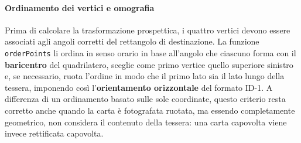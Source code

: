 \paragraph{Ordinamento dei vertici e omografia}
Prima di calcolare la trasformazione prospettica, i quattro vertici devono essere associati agli angoli corretti del rettangolo di destinazione.
La funzione \texttt{orderPoints} li ordina in senso orario in base all'angolo che ciascuno forma con il \textbf{baricentro} del quadrilatero, sceglie come primo vertice quello superiore sinistro e, se necessario, ruota l'ordine in modo che il primo lato sia il lato lungo della tessera, imponendo così l'\textbf{orientamento orizzontale} del formato ID-1.
A differenza di un ordinamento basato sulle sole coordinate, questo criterio resta corretto anche quando la carta è fotografata ruotata, ma essendo completamente geometrico, non considera il contenuto della tessera: una carta capovolta viene invece rettificata capovolta.

